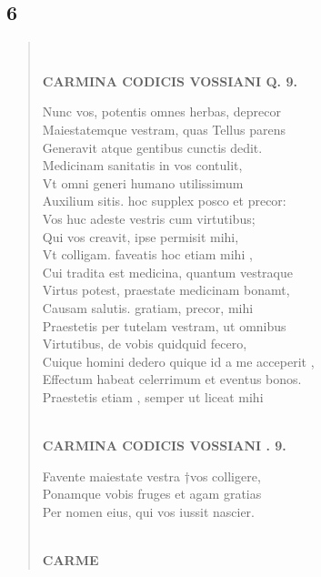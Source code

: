 \documentclass[11pt, a4paper]{report}
\begin{document}
            \subsection*{6}
      \begin{verse}
      
        ﻿\pagebreak 
    \begin{center} \textbf{CARMINA CODICIS VOSSIANI Q. 9.} \end{center} \marginpar{[28]} Nunc vos, potentis omnes herbas, deprecor \\ Maiestatemque vestram, quas Tellus parens \\ Generavit atque gentibus cunctis dedit. \\ Medicinam sanitatis in vos contulit, \\ Vt omni generi humano utilissimum \\ Auxilium sitis. hoc supplex posco  \lbrack et \rbrack  precor: \\ Vos huc adeste vestris cum virtutibus; \\ Qui vos creavit, ipse permisit mihi, \\ Vt colligam. faveatis hoc etiam  \lbrack mihi \rbrack , \\ Cui tradita est medicina, quantum vestraque \\ Virtus potest, praestate medicinam bonamt, \\ Causam salutis. gratiam, precor, mihi \\ Praestetis per tutelam vestram, ut omnibus \\ Virtutibus, de vobis quidquid fecero, \\ Cuique homini dedero  \lbrack quique id a me acceperit \rbrack , \\ Effectum habeat celerrimum et eventus bonos. \\  \lbrack Praestetis etiam \rbrack , semper ut liceat mihi \\ 
        ﻿\pagebreak 
    \begin{center} \textbf{CARMINA CODICIS VOSSIANI . 9.} \end{center} \marginpar{[29]} Favente maiestate vestra †vos colligere, \\ Ponamque vobis fruges et agam gratias \\ Per nomen eius, qui vos iussit nascier. \\ 
        ﻿\pagebreak 
    \begin{center} \textbf{CARME} \end{center}
      \end{verse}
  
\end{document}
